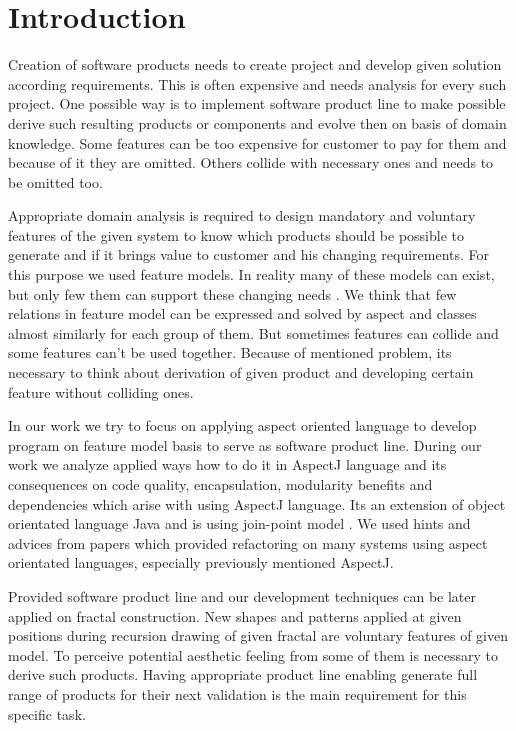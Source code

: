 \documentclass[11pt,slovak,a4paper,twoside]{article}
\begin{document}
\section{Introduction} \label{introduction}

Creation of software products needs to create project and develop given solution according requirements. This is often expensive and needs analysis for every such project. One possible way is to implement software product line to make possible derive such resulting products or components and evolve then on basis of domain knowledge. Some features can be too expensive for customer to pay for them and because of it they are omitted. Others collide with necessary ones and needs to be omitted too. 

Appropriate domain analysis is required to design mandatory and voluntary features of the given system to know which products should be possible to generate and if it brings value to customer and his changing requirements. For this purpose we used feature models. In reality many of these models can exist, but only few them can support these changing needs \cite{beuche_software_2006}. We think that few relations in feature model can be expressed and solved by aspect and classes almost similarly for each group of them. But sometimes features can collide and some features can't be used together. Because of mentioned problem, its necessary to think about derivation of given product and developing certain feature without colliding ones.  

In our work we try to focus on applying aspect oriented language to develop program on feature model basis to serve as software product line. During our work we analyze applied ways how to do it in AspectJ language and its consequences on code quality, encapsulation, modularity benefits and dependencies which arise with using AspectJ language. Its an extension of object orientated language Java and is using join-point model \cite{hotdraw_deursen_2009}. We used hints and advices from papers which provided refactoring on many systems using aspect orientated languages, especially previously mentioned AspectJ.

Provided software product line and our development techniques can be later applied on fractal construction. New shapes and patterns applied at given positions during recursion drawing of given fractal are voluntary features of given model. To perceive potential aesthetic feeling from some of them is necessary to derive such products. Having appropriate product line enabling generate full range of products for their next validation is the main requirement for this specific task.
\end{document}
